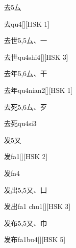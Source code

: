 \begin{entry}{去}{5}{⼛}
  \begin{phonetics}{去}{qu4}[][HSK 1]
  \end{phonetics}
\end{entry}

\begin{entry}{去世}{5,5}{⼛、⼀}
  \begin{phonetics}{去世}{qu4shi4}[][HSK 3]
  \end{phonetics}
\end{entry}

\begin{entry}{去年}{5,6}{⼛、⼲}
  \begin{phonetics}{去年}{qu4nian2}[][HSK 1]
  \end{phonetics}
\end{entry}

\begin{entry}{去死}{5,6}{⼛、⽍}
  \begin{phonetics}{去死}{qu4si3}
  \end{phonetics}
\end{entry}

\begin{entry}{发}{5}{⼜}
  \begin{phonetics}{发}{fa1}[][HSK 2]
  \end{phonetics}
  \begin{phonetics}{发}{fa4}
  \end{phonetics}
\end{entry}

\begin{entry}{发出}{5,5}{⼜、⼐}
  \begin{phonetics}{发出}{fa1 chu1}[][HSK 3]
  \end{phonetics}
\end{entry}

\begin{entry}{发布}{5,5}{⼜、⼱}
  \begin{phonetics}{发布}{fa1bu4}[][HSK 5]
  \end{phonetics}
\end{entry}

